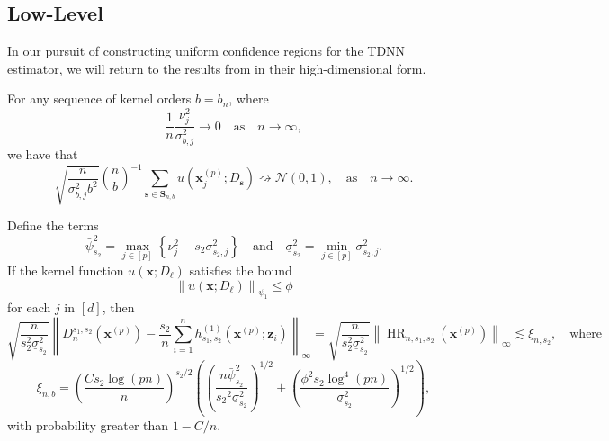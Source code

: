 \documentclass[letterpaper,10pt]{article}
\numberwithin{equation}{section}
\numberwithin{theorem}{section}
\numberwithin{remark}{section}
\numberwithin{example}{section}
\theoremstyle{definition}
\newcommand{\1}{\mathbb{1}}
\begin{document}
\subsection{Low-Level}
In our pursuit of constructing uniform confidence regions for the TDNN estimator, we will return to the results from \citet{ritzwoller_uniform_2024} in their high-dimensional form.
\vspace{0.5cm}
\begin{theorem}
	For any sequence of kernel orders $b=b_n$, where
	\begin{equation}
		\frac{1}{n} \frac{\nu_j^2}{\sigma_{b, j}^2} \rightarrow 0
		\quad \text{as} \quad
		n \rightarrow \infty,
	\end{equation}
	we have that
	\begin{equation}
		\sqrt{\frac{n}{\sigma_{b, j}^2 b^2}} \binom{n}{b}^{-1} \sum_{\mathbf{s} \in \mathbf{S}_{n, b}} u\left(\mathbf{x}^{(p)}_{j} ; D_{\mathbf{s}}\right) \rightsquigarrow \mathcal{N}(0,1),
		\quad \text{as} \quad
		n \rightarrow \infty.
	\end{equation}
\end{theorem}

\vspace{0.5cm}
\begin{theorem}\label{ritzwoller_Thm4_2}
	Define the terms
	\begin{equation}
		\bar{\psi}_{s_2}^2 
		= \max_{j \in[p]}\left\{\nu_j^2- s_2 \sigma_{s_2, j}^2\right\}
		\quad \text {and} \quad
		\underline{\sigma}_{s_2}^2
		= \min_{j \in[p]} \sigma_{s_2, j}^2.
	\end{equation}
	If the kernel function $u\left(\mathbf{x} ; D_{\ell}\right)$ satisfies the bound
	\begin{equation}
		\left\|u\left(\mathbf{x} ; D_{\ell}\right)\right\|_{\psi_1} \leq \phi
	\end{equation}
	for each $j$ in $[d]$, then
	\begin{equation}
		\sqrt{\frac{n}{s_2^2 \underline{\sigma}_{s_2}^2}}
		\left\|D_{n}^{s_1, s_2}(\mathbf{x}^{(p)}) - \frac{s_2}{n} \sum_{i=1}^n h^{(1)}_{s_1, s_2}(\mathbf{x}^{(p)}; \mathbf{z}_{i})\right\|_{\infty} 
		= \sqrt{\frac{n}{s_2^2 \underline{\sigma}_{s_2}^2}} \left\|\operatorname{HR}_{n, s_1, s_2}(\mathbf{x}^{(p)})\right\|_{\infty}
		\lesssim \xi_{n, s_2},
		\quad \text {where}
	\end{equation}
	\begin{equation}
		\xi_{n, b}
		= \left(\frac{C s_2 \log(p n)}{n}\right)^{s_2 / 2}\left(\left(\frac{n \bar{\psi}_{s_2}^2}{{s_2}^2 \underline{\sigma}_{s_2}^2}\right)^{1 / 2}+\left(\frac{\phi^2 s_2 \log ^4(p n)}{\underline{\sigma}_{s_2}^2}\right)^{1 / 2}\right),
	\end{equation}
	with probability greater than $1-C / n$.
\end{theorem}
\end{document}
